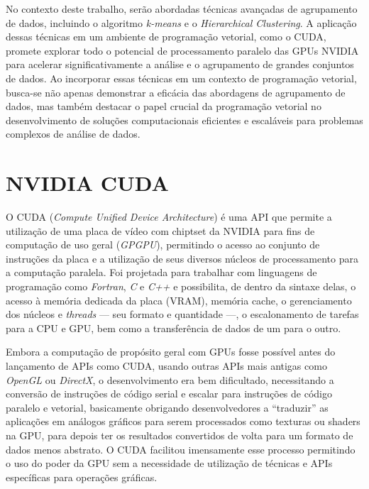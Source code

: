 \documentclass[12pt,
openright, 
oneside, %
a4paper,    %
brazil]{facom-ufu-abntex2}
\begin{document}
No contexto deste trabalho, serão abordadas técnicas avançadas de agrupamento de dados, incluindo o algoritmo \textit{k-means} e o \textit{Hierarchical Clustering}. A aplicação dessas técnicas em um ambiente de programação vetorial, como o CUDA, promete explorar todo o potencial de processamento paralelo das GPUs NVIDIA para acelerar significativamente a análise e o agrupamento de grandes conjuntos de dados. Ao incorporar essas técnicas em um contexto de programação vetorial, busca-se não apenas demonstrar a eficácia das abordagens de agrupamento de dados, mas também destacar o papel crucial da programação vetorial no desenvolvimento de soluções computacionais eficientes e escaláveis para problemas complexos de análise de dados.




\section{NVIDIA CUDA}
\label{sec:cuda}

O CUDA (\textit{Compute Unified Device Architecture}) é uma API que permite a utilização de uma placa de vídeo com chiptset da NVIDIA para fins de computação de uso geral (\textit{GPGPU}), permitindo o acesso ao conjunto de instruções da placa e a utilização de seus diversos núcleos de processamento para a computação paralela. Foi projetada para trabalhar com linguagens de programação como \textit{Fortran}, \textit{C} e \textit{C++} e possibilita, de dentro da sintaxe delas, o acesso à memória dedicada da placa (VRAM), memória cache, o gerenciamento dos núcleos e \textit{threads} --- seu formato e quantidade ---, o escalonamento de tarefas para a CPU e GPU, bem como a transferência de dados de um para o outro.

Embora a computação de propósito geral com GPUs fosse possível antes do lançamento de APIs como CUDA, usando outras APIs mais antigas como \textit{OpenGL} ou \textit{DirectX}, o desenvolvimento era bem dificultado, necessitando a conversão de instruções de código serial e escalar para instruções de código paralelo e vetorial, basicamente obrigando desenvolvedores a \enquote{traduzir} as aplicações em análogos gráficos para serem processados como texturas ou shaders na GPU, para depois ter os resultados convertidos de volta para um formato de dados menos abstrato. O CUDA facilitou imensamente esse processo permitindo o uso do poder da GPU sem a necessidade de utilização de técnicas e APIs específicas para operações gráficas.
\end{document}
